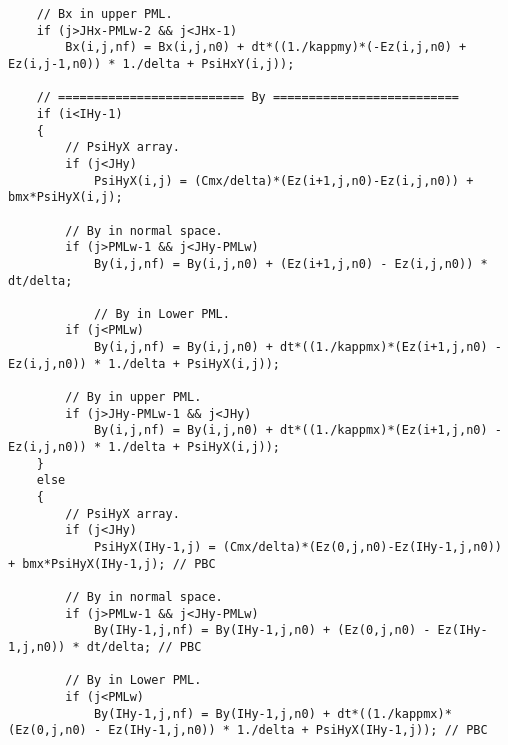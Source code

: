 \begin{lstlisting}
	// Bx in upper PML.
	if (j>JHx-PMLw-2 && j<JHx-1)
		Bx(i,j,nf) = Bx(i,j,n0) + dt*((1./kappmy)*(-Ez(i,j,n0) + Ez(i,j-1,n0)) * 1./delta + PsiHxY(i,j));

	// ========================== By ==========================
	if (i<IHy-1)
	{
		// PsiHyX array.
		if (j<JHy)
			PsiHyX(i,j) = (Cmx/delta)*(Ez(i+1,j,n0)-Ez(i,j,n0)) + bmx*PsiHyX(i,j);

		// By in normal space.
		if (j>PMLw-1 && j<JHy-PMLw)
			By(i,j,nf) = By(i,j,n0) + (Ez(i+1,j,n0) - Ez(i,j,n0)) * dt/delta;

			// By in Lower PML.
		if (j<PMLw)
			By(i,j,nf) = By(i,j,n0) + dt*((1./kappmx)*(Ez(i+1,j,n0) - Ez(i,j,n0)) * 1./delta + PsiHyX(i,j));

		// By in upper PML.
		if (j>JHy-PMLw-1 && j<JHy)
			By(i,j,nf) = By(i,j,n0) + dt*((1./kappmx)*(Ez(i+1,j,n0) - Ez(i,j,n0)) * 1./delta + PsiHyX(i,j));
	}
	else
	{
		// PsiHyX array.
		if (j<JHy)
			PsiHyX(IHy-1,j) = (Cmx/delta)*(Ez(0,j,n0)-Ez(IHy-1,j,n0)) + bmx*PsiHyX(IHy-1,j); // PBC

		// By in normal space.
		if (j>PMLw-1 && j<JHy-PMLw)
			By(IHy-1,j,nf) = By(IHy-1,j,n0) + (Ez(0,j,n0) - Ez(IHy-1,j,n0)) * dt/delta; // PBC

		// By in Lower PML.
		if (j<PMLw)
			By(IHy-1,j,nf) = By(IHy-1,j,n0) + dt*((1./kappmx)*(Ez(0,j,n0) - Ez(IHy-1,j,n0)) * 1./delta + PsiHyX(IHy-1,j)); // PBC


\end{lstlisting}
